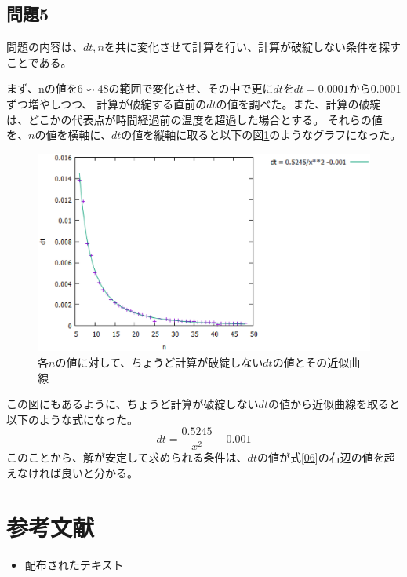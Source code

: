 \documentclass{jsarticle}
\begin{document}
\subsection{問題5}
問題の内容は、$dt,n$を共に変化させて計算を行い、計算が破綻しない条件を探すことである。

まず、nの値を$6\backsim 48$の範囲で変化させ、その中で更に$dt$を$dt=0.0001$から0.0001ずつ増やしつつ、
計算が破綻する直前の$dt$の値を調べた。また、計算の破綻は、どこかの代表点が時間経過前の温度を超過した場合とする。
それらの値を、$n$の値を横軸に、$dt$の値を縦軸に取ると以下の図\ref{fig09}のようなグラフになった。
\begin{figure}[H]
	\centering
	\includegraphics[width=14cm]{pic09.eps}
	\caption{各$n$の値に対して、ちょうど計算が破綻しない$dt$の値とその近似曲線}
	\label{fig09}
\end{figure}
この図にもあるように、ちょうど計算が破綻しない$dt$の値から近似曲線を取ると以下のような式になった。
\begin{equation}
	dt = \frac{0.5245}{x^2} - 0.001	\label{06}
\end{equation}
このことから、解が安定して求められる条件は、$dt$の値が式\ref{06}の右辺の値を超えなければ良いと分かる。

\section{参考文献}

\begin{itemize}
  \item 配布されたテキスト
\end{itemize}
\end{document}
